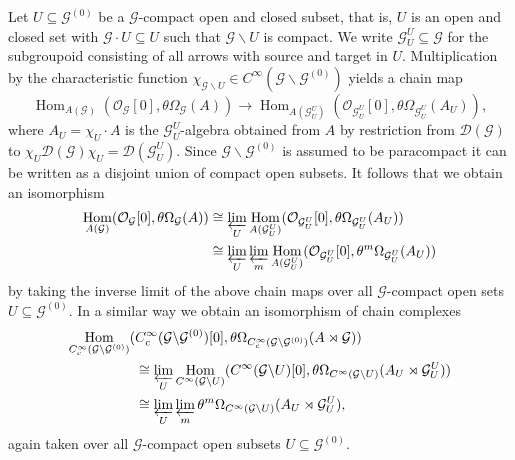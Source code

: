 \documentclass{amsart}
\newcommand{\G}{\mathcal{G}}
\newcommand{\D}{\mathcal{D}}
\renewcommand{\O}{\mathcal{O}}
\newcommand{\DG}{\mathcal{D}(\mathcal{G})}
\newcommand{\OG}{\mathcal{O}_{\mathcal{G}}}
\newcommand{\ccinfty}{C_c^\infty}
\newcommand{\cinfty}{C^\infty}
\DeclareMathOperator{\Hom}{Hom}
\begin{document}
Let $ U \subseteq \G^{(0)} $ be a $ \G $-compact open and closed subset, that is, $ U $ is an open and closed set with $ \G \cdot U \subseteq U $ such that $ \G \backslash U $ is compact. We write $ \G^U_U \subseteq \G $ for the subgroupoid consisting of all arrows with source and target in $ U $. 
Multiplication by the characteristic function $ \chi_{\G \backslash U} \in \cinfty(\G\backslash \G^{(0)}) $ yields a chain map 
$$
\Hom_{A(\G)}(\OG[0], \theta \Omega_\G(A)) \rightarrow \Hom_{A(\G^U_U)}(\O_{\G^U_U}[0], \theta \Omega_{\G^U_U}(A_U)), 
$$
where $ A_U = \chi_U \cdot A $ is the $ \G^U_U $-algebra obtained from $ A $ by restriction from $ \DG $ to $ \chi_U \DG \chi_U = \D(\G^U_U) $. 
Since $ \G \backslash \G^{(0)} $ is assumed to be paracompact it can be written as a disjoint union of compact open subsets. It follows that we obtain an isomorphism 
\begin{align*}
\Hom_{A(\G)}(\OG[0], \theta \Omega_\G(A)) &\cong \varprojlim_U \Hom_{A(\G^U_U)}(\O_{\G^U_U}[0], \theta \Omega_{\G^U_U}(A_U)) \\
&\cong \varprojlim_U \varprojlim_m \Hom_{A(\G^U_U)}(\O_{\G^U_U}[0], \theta^m \Omega_{\G^U_U}(A_U)) 
\end{align*}
by taking the inverse limit of the above chain maps over all $ \G $-compact open 
sets $ U \subseteq \G^{(0)} $. In a similar way we obtain an isomorphism of chain complexes
\begin{align*}
\Hom_{\ccinfty(\G \backslash \G^{(0)})}(&\ccinfty(\G \backslash \G^{(0)})[0], \theta \Omega_{\ccinfty(\G \backslash \G^{(0)})}(A \rtimes \G)) \\
&\cong \varprojlim_U \Hom_{\cinfty(\G \backslash U)}(\cinfty(\G \backslash U)[0], \theta \Omega_{\cinfty(\G \backslash U)}(A_U \rtimes \G_U^U)) \\
&\cong \varprojlim_U \varprojlim_m \theta^m \Omega_{\cinfty(\G \backslash U)}(A_U \rtimes \G_U^U),
\end{align*}
again taken over all $ \G $-compact open subsets $ U \subseteq \G^{(0)} $. 
\end{document}
